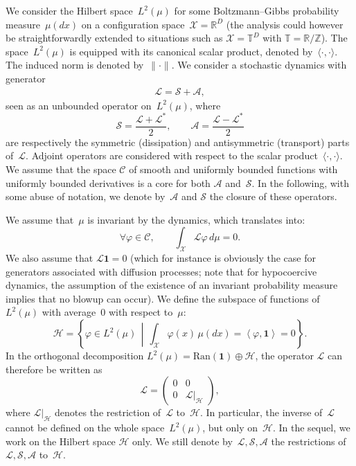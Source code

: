 \documentclass{article}
\newcommand{\cL}{\mathcal{L}}
\newcommand{\cLs}{\mathcal{S}}
\newcommand{\cLa}{\mathcal{A}}
\newcommand{\cX}{\mathcal{X}}
\newcommand{\R}{\mathbb{R}}
\newcommand{\cH}{\mathcal{H}}
\begin{document}
We consider the Hilbert space~$L^2(\mu)$ for some Boltzmann--Gibbs probability measure~$\mu(dx)$ on a configuration space~$\cX = \R^D$ (the analysis could however be straightforwardly extended to situations such as $\cX = \mathbb{T}^D$ with $\mathbb{T} = \mathbb{R} / \mathbb{Z}$). The space~$L^2(\mu)$ is equipped with its canonical scalar product, denoted by~$\langle\cdot,\cdot\rangle$. The induced norm is denoted by~$\|\cdot\|$. We consider a stochastic dynamics with generator
\begin{align*}
  \cL = \cLs + \cLa,
\end{align*}
seen as an unbounded operator on~$L^2(\mu)$, where
\[
  \cLs = \frac{\cL+\cL^*}{2}, \qquad \cLa = \frac{\cL-\cL^*}{2}
\]
are respectively the symmetric (dissipation) and antisymmetric (transport) parts of~$\cL$. Adjoint operators are considered with respect to the scalar product~$\langle\cdot,\cdot\rangle$. We assume that the space $\mathscr{C}$ of smooth and uniformly bounded functions with uniformly bounded derivatives is a core for both $\cLa$ and~$\cLs$. In the following, with some abuse of notation, we denote by~$\cLa$ and $\cLs$ the closure of these operators.

We assume that~$\mu$ is invariant by the dynamics, which translates into:
\[
\forall \varphi \in \mathscr{C}, \qquad \int_\cX \cL \varphi \, d\mu = 0.
\]
We also assume that $\cL\mathbf{1} = 0$ (which for instance is obviously the case for generators associated with diffusion processes; note that for hypocoercive dynamics, the assumption of the existence of an invariant probability measure implies that no blowup can occur). We define the subspace of functions of~$L^2(\mu)$ with average~0 with respect to~$\mu$:
\[
\cH = \left\{ \varphi \in L^2(\mu) \, \middle| \, \int_\cX \varphi(x) \, \mu(dx) = \left\langle \varphi,\mathbf{1}\right\rangle = 0 \right\}.
\]
In the orthogonal decomposition $L^2(\mu) = \mathrm{Ran}(\mathbf{1}) \oplus \cH$, the operator $\cL$ can therefore be written as
\[
  \cL = \begin{pmatrix} 0 & 0 \\
  0 & \cL|_\cH \end{pmatrix},
\]
where $\cL|_\cH$ denotes the restriction of~$\cL$ to~$\cH$. In particular, the inverse of~$\cL$ cannot be defined on the whole space~$L^2(\mu)$, but only on~$\cH$. In the sequel, we work on the Hilbert space $\cH$ only. We still denote by~$\cL,\cLs,\cLa$ the restrictions of~$\cL,\cLs,\cLa$ to~$\cH$.
\end{document}
